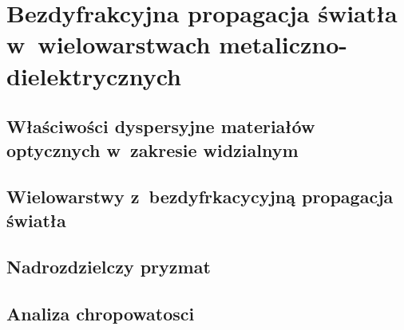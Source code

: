 \chapter{Bezdyfrakcyjna propagacja światła w~wielowarstwach metaliczno-dielektrycznych}
\label{art:nondiff}

\section{Właściwości dyspersyjne materiałów optycznych w~zakresie widzialnym}

\section{Wielowarstwy z~bezdyfrkacycyjną propagacja światła}

\section{Nadrozdzielczy pryzmat}


\section{Analiza chropowatosci}



